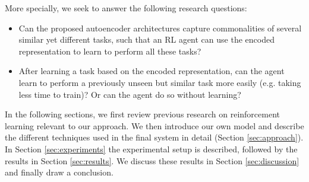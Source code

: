 More specially, we seek to answer the following research questions:
\begin{itemize}
	\item Can the proposed autoencoder architectures capture commonalities of several similar yet different tasks, such that an RL agent can use the encoded representation to learn to perform all these tasks?
	\item After learning a task based on the encoded representation, can the agent learn to perform a previously unseen but similar task more easily (e.g. taking less time to train)? Or can the agent do so without learning?
\end{itemize}

In the following sections, we first review previous research on reinforcement learning relevant to our approach. We then introduce our own model and describe the different techniques used in the final system in detail (Section \ref{sec:approach}). In Section \ref{sec:experiments} the experimental setup is described, followed by the results in Section \ref{sec:results}. We discuss these results in Section \ref{sec:discussion} and finally draw a conclusion.